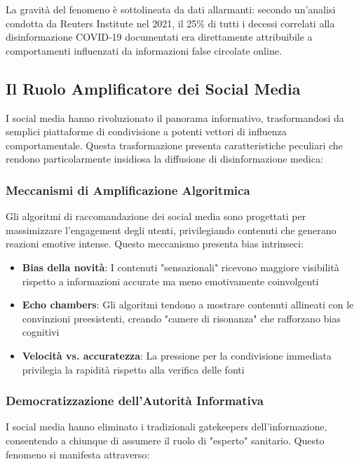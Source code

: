 \documentclass[12pt,a4paper]{report}
\begin{document}
La gravità del fenomeno è sottolineata da dati allarmanti: secondo un'analisi condotta da Reuters Institute nel 2021, il 25\% di tutti i decessi correlati alla disinformazione COVID-19 documentati era direttamente attribuibile a comportamenti influenzati da informazioni false circolate online.

\subsection{Il Ruolo Amplificatore dei Social Media}

I social media hanno rivoluzionato il panorama informativo, trasformandosi da semplici piattaforme di condivisione a potenti vettori di influenza comportamentale. Questa trasformazione presenta caratteristiche peculiari che rendono particolarmente insidiosa la diffusione di disinformazione medica:

\subsubsection{Meccanismi di Amplificazione Algoritmica}

Gli algoritmi di raccomandazione dei social media sono progettati per massimizzare l'engagement degli utenti, privilegiando contenuti che generano reazioni emotive intense. Questo meccanismo presenta bias intrinseci:

\begin{itemize}
    \item \textbf{Bias della novità}: I contenuti "sensazionali" ricevono maggiore visibilità rispetto a informazioni accurate ma meno emotivamente coinvolgenti
    \item \textbf{Echo chambers}: Gli algoritmi tendono a mostrare contenuti allineati con le convinzioni preesistenti, creando "camere di risonanza" che rafforzano bias cognitivi
    \item \textbf{Velocità vs. accuratezza}: La pressione per la condivisione immediata privilegia la rapidità rispetto alla verifica delle fonti
\end{itemize}

\subsubsection{Democratizzazione dell'Autorità Informativa}

I social media hanno eliminato i tradizionali gatekeepers dell'informazione, consentendo a chiunque di assumere il ruolo di "esperto" sanitario. Questo fenomeno si manifesta attraverso:
\end{document}
